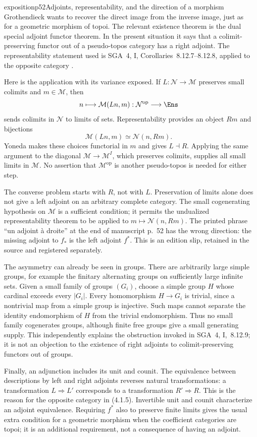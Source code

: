 \begin{dcomment}{exposition}{p52}{Adjoints, representability, and the direction of a morphism}
Grothendieck wants to recover the direct image from the inverse image, just as for a geometric morphism of topoi. The relevant existence theorem is the dual special adjoint functor theorem. In the present situation it says that a colimit-preserving functor out of a pseudo-topos category has a right adjoint. The representability statement used is SGA~4, I, Corollaries~8.12.7--8.12.8, applied to the opposite category \citep{SGA4I1972}.

Here is the application with its variance exposed. If $L:\mathcal N\to\mathcal M$ preserves small colimits and $m\in\mathcal M$, then
\[
 n\longmapsto\mathcal M(Ln,m):\mathcal N^{\mathrm{op}}\longrightarrow\Ens
\]
sends colimits in $\mathcal N$ to limits of sets. Representability provides an object $Rm$ and bijections
\[
 \mathcal M(Ln,m)\simeq\mathcal N(n,Rm).
\]
Yoneda makes these choices functorial in $m$ and gives $L\dashv R$. Applying the same argument to the diagonal $\mathcal M\to\mathcal M^I$, which preserves colimits, supplies all small limits in $\mathcal M$. No assertion that $\mathcal M^{\mathrm{op}}$ is another pseudo-topos is needed for either step.

The converse problem starts with $R$, not with $L$. Preservation of limits alone does not give a left adjoint on an arbitrary complete category. The small cogenerating hypothesis on $\mathcal M$ is a sufficient condition; it permits the undualized representability theorem to be applied to $m\mapsto\mathcal N(n,Rm)$. The printed phrase ``un adjoint \`a droite'' at the end of manuscript p.~52 has the wrong direction: the missing adjoint to $f_*$ is the left adjoint $f^*$. This is an edition slip, retained in the source and registered separately.

The asymmetry can already be seen in groups. There are arbitrarily large simple groups, for example the finitary alternating groups on sufficiently large infinite sets. Given a small family of groups $(G_i)$, choose a simple group $H$ whose cardinal exceeds every $|G_i|$. Every homomorphism $H\to G_i$ is trivial, since a nontrivial map from a simple group is injective. Such maps cannot separate the identity endomorphism of $H$ from the trivial endomorphism. Thus no small family cogenerates groups, although finite free groups give a small generating supply. This independently explains the obstruction invoked in SGA~4, I,~8.12.9; it is not an objection to the existence of right adjoints to colimit-preserving functors out of groups.

Finally, an adjunction includes its unit and counit. The equivalence between descriptions by left and right adjoints reverses natural transformations: a transformation $L\Rightarrow L'$ corresponds to a transformation $R'\Rightarrow R$. This is the reason for the opposite category in (4.1.5). Invertible unit and counit characterize an adjoint equivalence. Requiring $f^*$ also to preserve finite limits gives the usual extra condition for a geometric morphism when the coefficient categories are topoi; it is an additional requirement, not a consequence of having an adjoint.
\end{dcomment}

